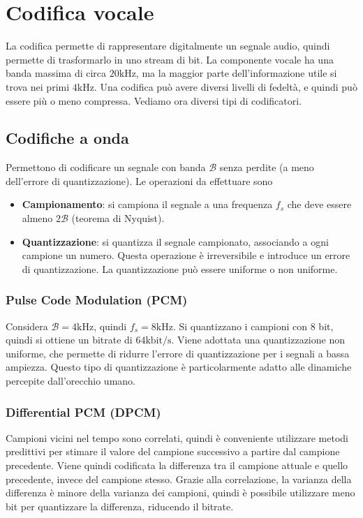 \section{Codifica vocale}
La codifica permette di rappresentare digitalmente un segnale audio, quindi permette di trasformarlo in uno stream di bit.
La componente vocale ha una banda massima di circa $20\text{kHz}$, ma la maggior parte dell'informazione utile si trova nei primi $4\text{kHz}$.
Una codifica può avere diversi livelli di fedeltà, e quindi può essere più o meno compressa.
Vediamo ora diversi tipi di codificatori.
\subsection{Codifiche a onda}
Permettono di codificare un segnale con banda $\mathcal{B}$ senza perdite (a meno dell'errore di quantizzazione).
Le operazioni da effettuare sono 
\begin{itemize}
	\item \textbf{Campionamento}: si campiona il segnale a una frequenza $f_s$ che deve essere almeno $2\mathcal{B}$ (teorema di Nyquist).
	\item \textbf{Quantizzazione}: si quantizza il segnale campionato, associando a ogni campione un numero. Questa operazione è irreversibile e introduce un errore di quantizzazione.
	La quantizzazione può essere uniforme o non uniforme.
\end{itemize}
\subsubsection{Pulse Code Modulation (PCM)}
Considera $\mathcal{B}=4\text{kHz}$, quindi $f_s=8\text{kHz}$.
Si quantizzano i campioni con $8$ bit, quindi si ottiene un bitrate di $64\text{kbit/s}$.
Viene adottata una quantizzazione non uniforme, che permette di ridurre l'errore di quantizzazione per i segnali a bassa ampiezza.
Questo tipo di quantizzazione è particolarmente adatto alle dinamiche percepite dall'orecchio umano.
\subsubsection{Differential PCM (DPCM)}
Campioni vicini nel tempo sono correlati, quindi è conveniente utilizzare metodi predittivi per stimare il valore del campione successivo a partire dal campione precedente.
Viene quindi codificata la differenza tra il campione attuale e quello precedente, invece del campione stesso.
Grazie alla correlazione, la varianza della differenza è minore della varianza dei campioni, 
quindi è possibile utilizzare meno bit per quantizzare la differenza, riducendo il bitrate.
